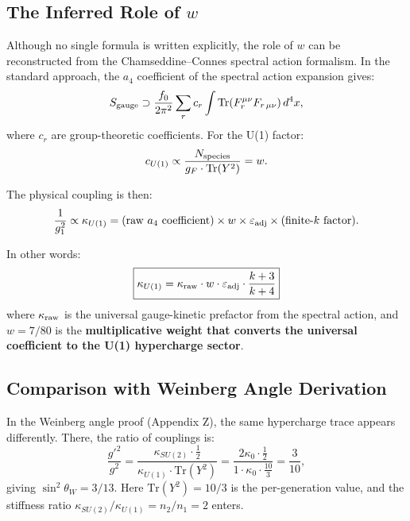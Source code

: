 \documentclass[11pt]{article}
\begin{document}
\subsection{The Inferred Role of $w$}

Although no single formula is written explicitly, the role of $w$ can be
reconstructed from the Chamseddine--Connes spectral action formalism.  In the
standard approach, the $a_4$ coefficient of the spectral action expansion gives:
\begin{equation}
S_{\rm gauge} \supset \frac{f_0}{2\pi^2}
\sum_r c_r \int \mathrm{Tr}(F_r^{\mu\nu} F_{r\,\mu\nu})\,d^4x,
\end{equation}
where $c_r$ are group-theoretic coefficients.  For the U(1) factor:
\begin{equation}
c_{U(1)} \propto \frac{N_{\rm species}}{g_F \cdot \mathrm{Tr}(Y^2)} = w.
\end{equation}

The physical coupling is then:
\begin{equation}
\frac{1}{g_1^2} \propto \kappa_{U(1)} = (\text{raw } a_4 \text{ coefficient})
\times w \times \varepsilon_{\rm adj} \times (\text{finite-}k \text{ factor}).
\end{equation}

In other words:
\begin{equation}
\boxed{\kappa_{U(1)} = \kappa_{\rm raw} \cdot w \cdot \varepsilon_{\rm adj}
\cdot \frac{k+3}{k+4}}
\end{equation}
where $\kappa_{\rm raw}$ is the universal gauge-kinetic prefactor from the
spectral action, and $w = 7/80$ is the \textbf{multiplicative weight that
converts the universal coefficient to the U(1) hypercharge sector}.

\subsection{Comparison with Weinberg Angle Derivation}

In the Weinberg angle proof (Appendix Z), the same hypercharge trace appears
differently.  There, the ratio of couplings is:
\begin{equation}
\frac{g'^2}{g^2}
= \frac{\kappa_{SU(2)} \cdot \tfrac{1}{2}}
       {\kappa_{U(1)} \cdot \mathrm{Tr}(Y^2)}
= \frac{2\kappa_0 \cdot \tfrac{1}{2}}{1 \cdot \kappa_0 \cdot \tfrac{10}{3}}
= \frac{3}{10},
\end{equation}
giving $\sin^2\theta_W = 3/13$.  Here $\mathrm{Tr}(Y^2) = 10/3$ is the
per-generation value, and the stiffness ratio $\kappa_{SU(2)}/\kappa_{U(1)}
= n_2/n_1 = 2$ enters.
\end{document}
